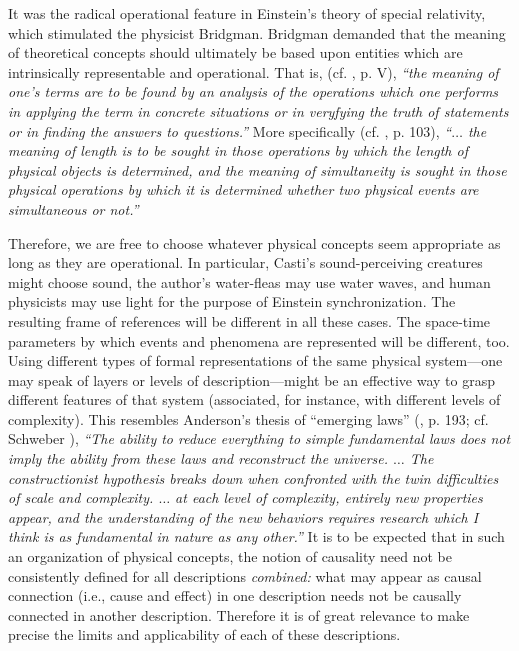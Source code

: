 \documentclass[pra,amsfonts, twocolumn]{revtex4}
\begin{document}

It was the radical operational feature in Einstein's theory of special
relativity, which stimulated the physicist Bridgman.
 Bridgman demanded that the meaning
of theoretical concepts should ultimately be based upon entities which
are intrinsically representable and operational. That is,
(cf. \cite{bridgman-reflextions}, p. V),
{\em ``the meaning of one's terms are to be found
by an analysis of the operations which one performs in applying the
term in concrete situations or in veryfying the truth of statements or
in finding the answers to questions.''}
More specifically (cf. \cite{bridgman}, p. 103),
{\em ``$\ldots$ the
meaning of length is to be sought in those operations by which the
length of physical objects is determined, and the meaning of
simultaneity is sought in those physical operations by which it is
determined whether two physical events are simultaneous or not.''}

Therefore, we are free to choose whatever physical concepts seem
appropriate as long as they are operational. In particular, Casti's
sound-perceiving creatures might choose sound, the author's water-fleas
may
use water waves, and human physicists may use light for the purpose of
Einstein synchronization. The resulting frame of references will be
different in all these cases. The space-time parameters by which events
and phenomena are represented will be different, too.
Using different types of formal representations
of the same physical
system---one may speak of
layers or levels of description---might be an effective way to
grasp different features
of that system (associated, for instance, with different levels of
complexity). This resembles Anderson's thesis of
``emerging laws'' (\cite{anderson}, p. 193; cf. Schweber
\cite{schweber}),
{\em ``The ability to reduce everything to simple fundamental laws does
not imply the ability from these laws and reconstruct the universe.
$\ldots$ The constructionist hypothesis breaks down when confronted
with the twin difficulties of scale and complexity. $\ldots$ at each
level of complexity, entirely new properties appear, and the
understanding of the new behaviors requires research which I think is
as fundamental in nature as any other.''}
It is to be expected that in such an organization of physical concepts,
the notion of causality need not be consistently defined for all
descriptions {\em combined:} what may appear as causal connection
(i.e., cause
and effect) in one description needs not be causally connected in
another description. Therefore it is of great relevance to make precise
the limits and applicability of each of these descriptions.
\end{document}
